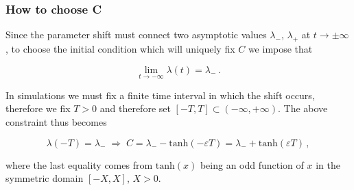 \documentclass[../main.tex]{subfiles}
\begin{document}
\subsubsection{How to choose C}\label{subsubsec:integration_constant}

Since the parameter shift must connect two asymptotic values $\lambda_{-},\,\lambda_{+}$ at $t\to\pm\infty$, to choose the initial condition which will uniquely fix $C$ we impose that

\begin{equation*}
        \lim_{t\to-\infty}\lambda(t) = \lambda_{-}\,.
\end{equation*}

In simulations we must fix a finite time interval in which the shift occurs, therefore we fix $T>0$ and therefore set $[-T, T]\subset(-\infty,+\infty)$.
The above constraint thus becomes

\begin{equation}\label{eq:integration_constant}
        \lambda(-T) = \lambda_{-} \;\Rightarrow\; C = \lambda_{-} - \text{tanh}(-\varepsilon T) = \lambda_{-} + \text{tanh}(\varepsilon T)\,,
\end{equation}

where the last equality comes from $\text{tanh}(x)$ being an odd function of $x$ in the symmetric domain $[-X,X]$, $X>0$.


\end{document}
